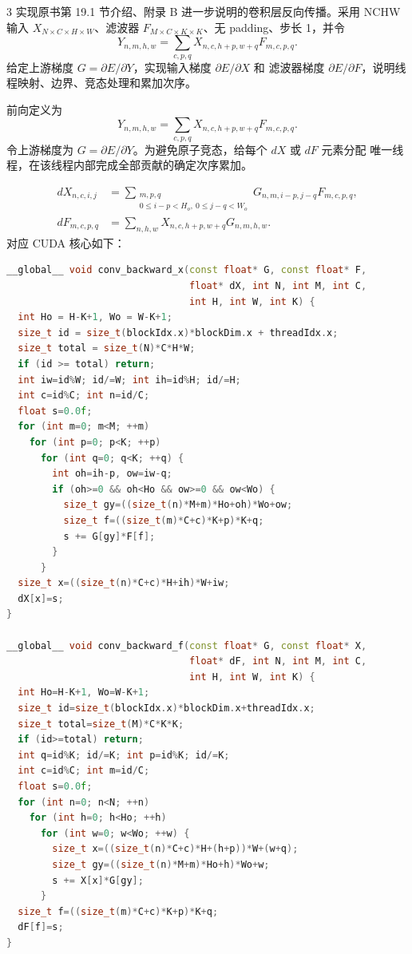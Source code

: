 \begin{solutionexercise}{3}
\problemheading 实现原书第 19.1 节介绍、附录 B 进一步说明的卷积层反向传播。采用
NCHW 输入 $X_{N\times C\times H\times W}$、滤波器
$F_{M\times C\times K\times K}$、无 padding、步长 1，并令
\[
Y_{n,m,h,w}=\sum_{c,p,q}X_{n,c,h+p,w+q}F_{m,c,p,q}.
\]
给定上游梯度 $G=\partial E/\partial Y$，实现输入梯度 $\partial E/\partial X$ 和
滤波器梯度 $\partial E/\partial F$，说明线程映射、边界、竞态处理和累加次序。

\approachheading 前向定义为
\[
Y_{n,m,h,w}=\sum_{c,p,q}X_{n,c,h+p,w+q}F_{m,c,p,q}.
\]
令上游梯度为 $G=\partial E/\partial Y$。为避免原子竞态，给每个 $dX$ 或 $dF$ 元素分配
唯一线程，在该线程内部完成全部贡献的确定次序累加。

\answerheading
\begin{align*}
dX_{n,c,i,j}
 &=\sum_{\substack{m,p,q\\0\le i-p<H_o,\ 0\le j-q<W_o}}
     G_{n,m,i-p,j-q}F_{m,c,p,q},\\
dF_{m,c,p,q}
 &=\sum_{n,h,w}X_{n,c,h+p,w+q}G_{n,m,h,w}.
\end{align*}
对应 CUDA 核心如下：
\begin{lstlisting}[language=C++]
__global__ void conv_backward_x(const float* G, const float* F,
                                float* dX, int N, int M, int C,
                                int H, int W, int K) {
  int Ho = H-K+1, Wo = W-K+1;
  size_t id = size_t(blockIdx.x)*blockDim.x + threadIdx.x;
  size_t total = size_t(N)*C*H*W;
  if (id >= total) return;
  int iw=id%W; id/=W; int ih=id%H; id/=H;
  int c=id%C; int n=id/C;
  float s=0.0f;
  for (int m=0; m<M; ++m)
    for (int p=0; p<K; ++p)
      for (int q=0; q<K; ++q) {
        int oh=ih-p, ow=iw-q;
        if (oh>=0 && oh<Ho && ow>=0 && ow<Wo) {
          size_t gy=((size_t(n)*M+m)*Ho+oh)*Wo+ow;
          size_t f=((size_t(m)*C+c)*K+p)*K+q;
          s += G[gy]*F[f];
        }
      }
  size_t x=((size_t(n)*C+c)*H+ih)*W+iw;
  dX[x]=s;
}

__global__ void conv_backward_f(const float* G, const float* X,
                                float* dF, int N, int M, int C,
                                int H, int W, int K) {
  int Ho=H-K+1, Wo=W-K+1;
  size_t id=size_t(blockIdx.x)*blockDim.x+threadIdx.x;
  size_t total=size_t(M)*C*K*K;
  if (id>=total) return;
  int q=id%K; id/=K; int p=id%K; id/=K;
  int c=id%C; int m=id/C;
  float s=0.0f;
  for (int n=0; n<N; ++n)
    for (int h=0; h<Ho; ++h)
      for (int w=0; w<Wo; ++w) {
        size_t x=((size_t(n)*C+c)*H+(h+p))*W+(w+q);
        size_t gy=((size_t(n)*M+m)*Ho+h)*Wo+w;
        s += X[x]*G[gy];
      }
  size_t f=((size_t(m)*C+c)*K+p)*K+q;
  dF[f]=s;
}


\end{lstlisting}
\end{solutionexercise}

